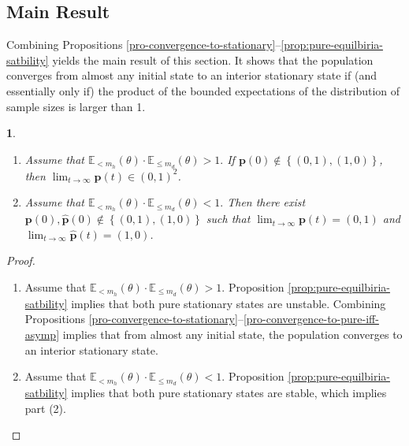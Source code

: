 \documentclass[12pt]{article}
\numberwithin{equation}{section}
\numberwithin{figure}{section}
\theoremstyle{definition}
\theoremstyle{plain}
\theoremstyle{plain}
\theoremstyle{plain}
\newtheorem{thm}{\protect\theoremname}
\theoremstyle{remark}
\theoremstyle{plain}
\theoremstyle{plain}
\providecommand{\theoremname}{Theorem}
\begin{document}
\subsection{Main Result}
Combining Propositions \ref{pro-convergence-to-stationary}--\ref{prop:pure-equilbiria-satbility} yields the main result of this section. It shows that the population converges from almost any initial state to an interior stationary state if 
(and essentially only if) the product of the bounded expectations of the distribution of sample sizes is larger than 1.
\begin{thm}\label{thm:global-mixed}
\begin{enumerate}
    \item Assume that $\mathbb{E}_{< m_{h}}\left(\theta\right)\cdot \mathbb{E}_{\leq m_{d}}\left(\theta\right)>1.$ If $\boldsymbol{p}(0)\notin\left\{ (0,1),(1,0)\right\}$, then $\lim_{t\rightarrow\infty}\mathbf{p}\left(t\right)\in{(0,1)}^2$.
    \item Assume that $\mathbb{E}_{< m_{h}}\left(\theta\right)\cdot \mathbb{E}_{\leq m_{d}}\left(\theta\right)<1.$ Then there exist $\boldsymbol{p}(0),\boldsymbol{\hat{p}}(0)\notin\left\{ (0,1),(1,0)\right\}$ such that $\lim_{t\rightarrow\infty}\mathbf{p}\left(t\right)=(0,1)$ and $\lim_{t\rightarrow\infty}\mathbf{\hat{p}}\left(t\right)=(1,0)$. 
\end{enumerate}
\end{thm}
\begin{proof}
\begin{enumerate}
    \item Assume that  $\mathbb{E}_{< m_{h}}\left(\theta\right)\cdot \mathbb{E}_{\leq m_{d}}\left(\theta\right)>1.$ Proposition \ref{prop:pure-equilbiria-satbility} implies that both pure stationary states are unstable. Combining Propositions \ref{pro-convergence-to-stationary}--\ref{pro-convergence-to-pure-iff-asymp} implies that from almost any initial state, the population converges to an interior stationary state.
    \item Assume that  $\mathbb{E}_{< m_{h}}\left(\theta\right)\cdot \mathbb{E}_{\leq m_{d}}\left(\theta\right)<1.$ Proposition \ref{prop:pure-equilbiria-satbility} implies that both pure stationary states are stable, which implies part (2). \qedhere
\end{enumerate}
\end{proof}
\end{document}
